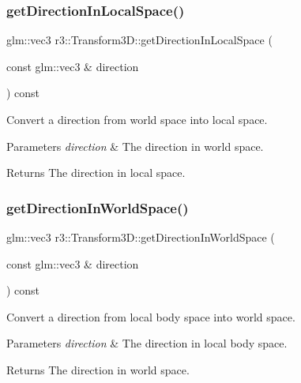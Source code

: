 \subsubsection{\texorpdfstring{get\+Direction\+In\+Local\+Space()}{getDirectionInLocalSpace()}}
{\footnotesize\ttfamily glm\+::vec3 r3\+::\+Transform3\+D\+::get\+Direction\+In\+Local\+Space (\begin{DoxyParamCaption}\item[{const glm\+::vec3 \&}]{direction }\end{DoxyParamCaption}) const}



Convert a direction from world space into local space. 


\begin{DoxyParams}{Parameters}
{\em direction} & The direction in world space. \\
\hline
\end{DoxyParams}
\begin{DoxyReturn}{Returns}
The direction in local space. 
\end{DoxyReturn}
\mbox{\label{classr3_1_1_transform3_d_a16c5747e86d579935b808a15f4804b2f}} 
\subsubsection{\texorpdfstring{get\+Direction\+In\+World\+Space()}{getDirectionInWorldSpace()}}
{\footnotesize\ttfamily glm\+::vec3 r3\+::\+Transform3\+D\+::get\+Direction\+In\+World\+Space (\begin{DoxyParamCaption}\item[{const glm\+::vec3 \&}]{direction }\end{DoxyParamCaption}) const}



Convert a direction from local body space into world space. 


\begin{DoxyParams}{Parameters}
{\em direction} & The direction in local body space. \\
\hline
\end{DoxyParams}
\begin{DoxyReturn}{Returns}
The direction in world space. 
\end{DoxyReturn}
\mbox{\label{classr3_1_1_transform3_d_a7c6348081c8c1b4d36af89fa7fe2103d}} 

